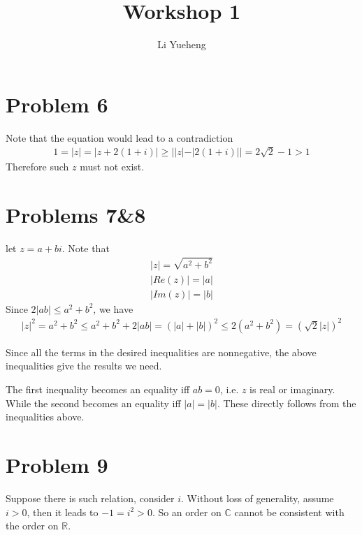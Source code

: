 \documentclass{article}
\begin{document}
\title{Workshop 1}
\author{Li Yueheng}
\maketitle


\section*{Problem 6}
Note that the equation would lead to a contradiction
\begin{align*}
	1=|z|=|z+2(1+i)|\geq ||z|-|2(1+i)||=2\sqrt{2}-1>1
\end{align*}
Therefore such $z$ must not exist.

\section*{Problems 7\&8}
let $z=a+bi$.
Note that
\begin{align*}
	|z|=\sqrt{a^2+b^2} \\
	|Re(z)|=|a| \\
	|Im(z)|=|b|
\end{align*}
Since $2|ab|\leq a^2+b^2$, we have
\begin{align*}
	|z|^2=a^2+b^2\leq a^2+b^2+2|ab|=(|a|+|b|)^2\leq 2(a^2+b^2)=(\sqrt{2}|z|)^2
\end{align*}

Since all the terms in the desired inequalities are nonnegative, the above inequalities give the results we need. 

The first inequality becomes an equality iff $ab=0$, i.e. $z$ is real or imaginary. While the second becomes an equality iff $|a|=|b|$. These directly follows from the inequalities above.

\section*{Problem 9}

Suppose there is such relation, consider $i$. Without loss of generality, assume $i>0$, then it leads to $-1=i^2>0$. So an order on $\mathbb{C}$ cannot be consistent with the order on $\mathbb{R}$. 
\end{document}
